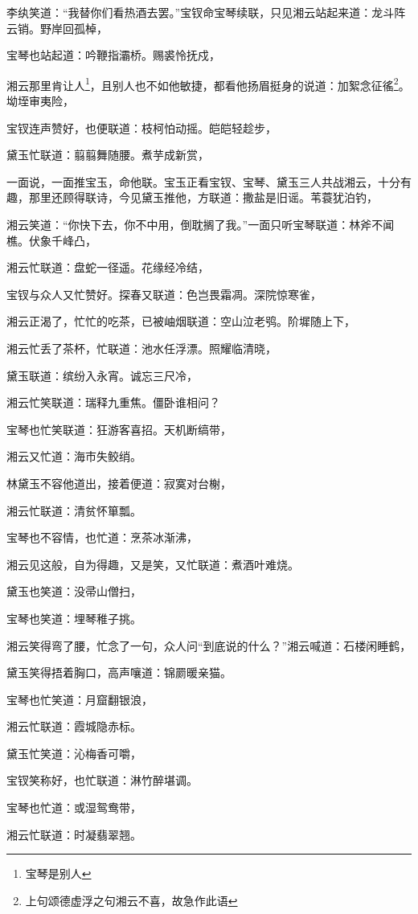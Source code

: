 \documentclass[12pt,oneside]{book}
\begin{document}
李纨笑道：“我替你们看热酒去罢。”宝钗命宝琴续联，只见湘云站起来道：龙斗阵云销。野岸回孤棹，

宝琴也站起道：吟鞭指灞桥。赐裘怜抚戍，

湘云那里肯让人\footnote{宝琴是别人}，且别人也不如他敏捷，都看他扬眉挺身的说道：加絮念征徭\footnote{上句颂德虚浮之句湘云不喜，故急作此语}。坳垤审夷险，

宝钗连声赞好，也便联道：枝柯怕动摇。皑皑轻趁步，

黛玉忙联道：翦翦舞随腰。煮芋成新赏，

一面说，一面推宝玉，命他联。宝玉正看宝钗、宝琴、黛玉三人共战湘云，十分有趣，那里还顾得联诗，今见黛玉推他，方联道：撒盐是旧谣。苇蓑犹泊钓，

湘云笑道：“你快下去，你不中用，倒耽搁了我。”一面只听宝琴联道：林斧不闻樵。伏象千峰凸，

湘云忙联道：盘蛇一径遥。花缘经冷结，

宝钗与众人又忙赞好。探春又联道：色岂畏霜凋。深院惊寒雀，

湘云正渴了，忙忙的吃茶，已被岫烟联道：空山泣老鸮。阶墀随上下，

湘云忙丢了茶杯，忙联道：池水任浮漂。照耀临清晓，

黛玉联道：缤纷入永宵。诚忘三尺冷，

湘云忙笑联道：瑞释九重焦。僵卧谁相问？

宝琴也忙笑联道：狂游客喜招。天机断缟带，

湘云又忙道：海市失鲛绡。

林黛玉不容他道出，接着便道：寂寞对台榭，

湘云忙联道：清贫怀箪瓢。

宝琴也不容情，也忙道：烹茶冰渐沸，

湘云见这般，自为得趣，又是笑，又忙联道：煮酒叶难烧。

黛玉也笑道：没帚山僧扫，

宝琴也笑道：埋琴稚子挑。

湘云笑得弯了腰，忙念了一句，众人问“到底说的什么？”湘云喊道：石楼闲睡鹤，

黛玉笑得捂着胸口，高声嚷道：锦罽暖亲猫。

宝琴也忙笑道：月窟翻银浪，

湘云忙联道：霞城隐赤标。

黛玉忙笑道：沁梅香可嚼，

宝钗笑称好，也忙联道：淋竹醉堪调。

宝琴也忙道：或湿鸳鸯带，

湘云忙联道：时凝翡翠翘。
\end{document}
